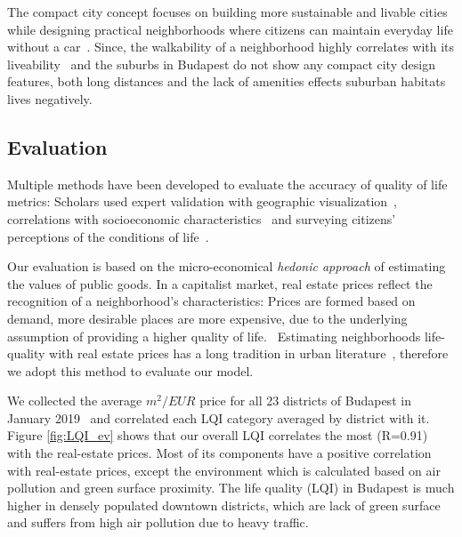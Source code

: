The compact city concept focuses on building more sustainable and livable cities while designing practical neighborhoods where citizens can maintain everyday life without a car~\cite{Dittmar2012New}. Since, the walkability of a neighborhood highly correlates with its liveability~\cite{Rogers2011Examining} and the suburbs in Budapest do not show any compact city design features, both long distances and the lack of amenities effects suburban habitats lives negatively.

\subsection{Evaluation}

Multiple methods have been developed to evaluate the accuracy of quality of life metrics: Scholars used expert validation with geographic visualization~\cite{Rinner2007Geographic,Gavrilidis2016Urban}, correlations with socioeconomic characteristics~\cite{Talen2002Pedestrian} and surveying citizens’ perceptions of the conditions of life~\cite{Santos2007Monitoring}.

Our evaluation is based on the micro-economical {\it hedonic approach} of estimating the values of public goods. In a capitalist market, real estate prices reflect the recognition of a neighborhood's characteristics: Prices are formed based on demand, more desirable places are more expensive, due to the underlying assumption of providing a higher quality of life.~\cite{Brueckner1999Central} Estimating neighborhoods life-quality with real estate prices has a long tradition in urban literature~\cite{Roback1982Wages,Blomquist1988New,Lora2011New}, therefore we adopt this method to evaluate our model.

We collected the average $m^{2}/EUR$ price for all 23 districts of Budapest in January 2019~\cite{HU2019RealEstate} and correlated each LQI category averaged by district with it. Figure \ref{fig:LQI_ev} shows that our overall LQI correlates the most (R=0.91) with the real-estate prices. Most of its components have a positive correlation with real-estate prices, except the environment which is calculated based on air pollution and green surface proximity. The life quality (LQI) in Budapest is much higher in densely populated downtown districts, which are lack of green surface and suffers from high air pollution due to heavy traffic.

